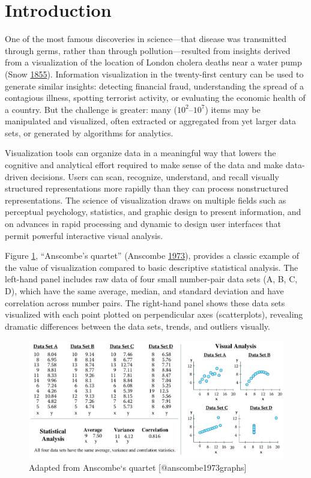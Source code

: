 \documentclass[]{krantz}
\begin{document}
\section{Introduction}\label{sec:viz-1}

One of the most famous discoveries in science---that disease was
transmitted through germs, rather than through pollution---resulted from
insights derived from a visualization of the location of London cholera
deaths near a water pump (Snow
\protect\hyperlink{ref-snow1855mode}{1855}). Information visualization
in the twenty-first century can be used to generate similar insights:
detecting financial fraud, understanding the spread of a contagious
illness, spotting terrorist activity, or evaluating the economic health
of a country. But the challenge is greater: many
(\(10^{2}\)--\(10^{7}\)) items may be manipulated and visualized, often
extracted or aggregated from yet larger data sets, or generated by
algorithms for analytics.

Visualization tools can organize data in a meaningful way that lowers
the cognitive and analytical effort required to make sense of the data
and make data-driven decisions. Users can scan, recognize, understand,
and recall visually structured representations more rapidly than they
can process nonstructured representations. The science of visualization
draws on multiple fields such as perceptual psychology, statistics, and
graphic design to present information, and on advances in rapid
processing and dynamic to design user interfaces that permit powerful
interactive visual analysis.

Figure \ref{fig:fig9-1}, ``Anscombe's quartet'' (Anscombe
\protect\hyperlink{ref-anscombe1973graphs}{1973}), provides a classic
example of the value of visualization compared to basic descriptive
statistical analysis. The left-hand panel includes raw data of four
small number-pair data sets (A, B, C, D), which have the same average,
median, and standard deviation and have correlation across number pairs.
The right-hand panel shows these data sets visualized with each point
plotted on perpendicular axes (scatterplots), revealing dramatic
differences between the data sets, trends, and outliers visually.

\begin{figure}

{\centering \includegraphics[width=0.9\linewidth]{ChapterViz/figures/fig9-1-new} 

}

\caption{Adapted from Anscombe`s quartet [@anscombe1973graphs]}\label{fig:fig9-1}
\end{figure}
\end{document}

